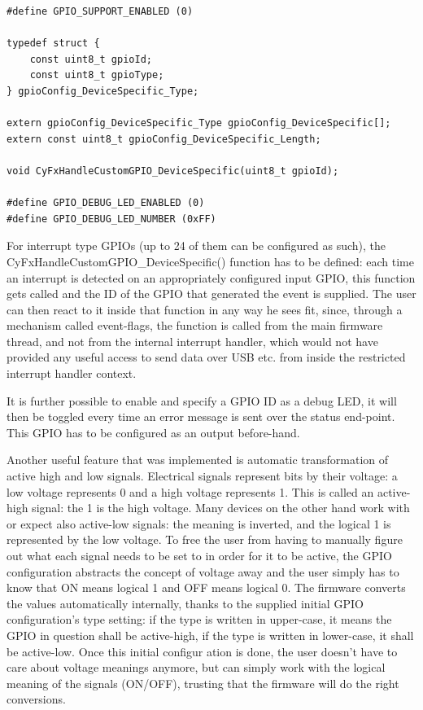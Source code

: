 \documentclass[a4paper,12pt]{report}
\begin{document}
\begin{lstlisting}
#define GPIO_SUPPORT_ENABLED (0)

typedef struct {
    const uint8_t gpioId;
    const uint8_t gpioType;
} gpioConfig_DeviceSpecific_Type;

extern gpioConfig_DeviceSpecific_Type gpioConfig_DeviceSpecific[];
extern const uint8_t gpioConfig_DeviceSpecific_Length;

void CyFxHandleCustomGPIO_DeviceSpecific(uint8_t gpioId);

#define GPIO_DEBUG_LED_ENABLED (0)
#define GPIO_DEBUG_LED_NUMBER (0xFF)
\end{lstlisting}

For interrupt type GPIOs (up to 24 of them can be configured as such), the CyFxHandleCustomGPIO\_DeviceSpecific() function has to be defined: each time an interrupt is detected on an appropriately configured input GPIO, this function gets called and the ID of the GPIO that generated the event is supplied. The user can then react to it inside that function in any way he sees fit, since, through a mechanism called event-flags, the function is called from the main firmware thread, and not from the internal interrupt handler, which would not have provided any useful access to send data over USB etc. from inside the restricted interrupt handler context.

It is further possible to enable and specify a GPIO ID as a debug LED, it will then be toggled every time an error message is sent over the status end-point. This GPIO has to be configured as an output before-hand.

Another useful feature that was implemented is automatic transformation of active high and low signals. Electrical signals represent bits by their voltage: a low voltage represents 0 and a high voltage represents 1. This is called an active-high signal: the 1 is the high voltage. Many devices on the other hand work with or expect also active-low signals: the meaning is inverted, and the logical 1 is represented by the low voltage. To free the user from having to manually figure out what each signal needs to be set to in order for it to be active, the GPIO configuration abstracts the concept of voltage away and the user simply has to know that ON means logical 1 and OFF means logical 0. The firmware converts the values automatically internally, thanks to the supplied initial GPIO configuration's type setting: if the type is written in upper-case, it means the GPIO in question shall be active-high, if the type is written in lower-case, it shall be active-low. Once this initial configur
 ation is done, the user doesn't have to care about voltage meanings anymore, but can simply work with the logical meaning of the signals (ON/OFF), trusting that the firmware will do the right conversions.
\end{document}
